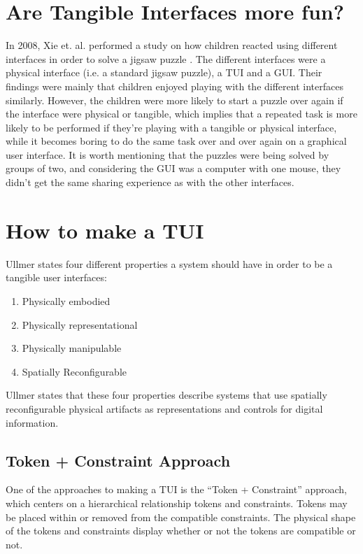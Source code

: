 \section{Are Tangible Interfaces more fun?}
In 2008, Xie et. al. performed a study on how children reacted using different interfaces in order to solve a jigsaw puzzle \cite{xie2008tangibles}. The different interfaces were a physical interface (i.e. a standard jigsaw puzzle), a TUI and a GUI. Their findings were mainly that children enjoyed playing with the different interfaces similarly. However, the children were more likely to start a puzzle over again if the interface were physical or tangible, which implies that a repeated task is more likely to be performed if they're playing with a tangible or physical interface, while it becomes boring to do the same task over and over again on a graphical user interface. It is worth mentioning that the puzzles were being solved by groups of two, and considering the GUI was a computer with one mouse, they didn't get the same sharing experience as with the other interfaces. 

\section{How to make a TUI}
Ullmer states four different properties a system should have in order to be a tangible user interfaces\cite{ullmer2002tangible}:

\begin{enumerate}
	\item{Physically embodied}
	\item{Physically representational}
	\item{Physically manipulable}
	\item{Spatially Reconfigurable}
\end{enumerate}

Ullmer states that these four properties describe systems that use spatially reconfigurable physical artifacts as representations and controls for digital information\cite{ullmer2002tangible}. 

\subsection{Token + Constraint Approach}
One of the approaches to making a TUI is the ``Token + Constraint'' approach, which centers on a hierarchical relationship tokens and constraints. Tokens may be placed within or removed from the compatible constraints. The physical shape of the tokens and constraints display whether or not the tokens are compatible or not.

